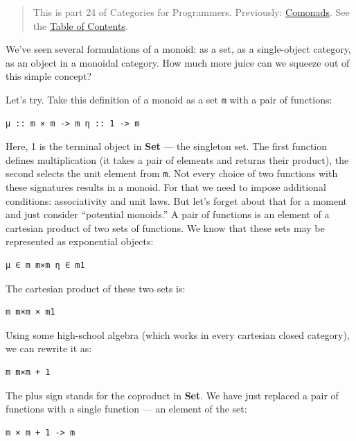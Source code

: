 \begin{quote}
This is part 24 of Categories for Programmers. Previously:
\href{https://bartoszmilewski.com/2017/01/02/comonads/}{Comonads}. See
the
\href{https://bartoszmilewski.com/2014/10/28/category-theory-for-programmers-the-preface/}{Table
of Contents}.
\end{quote}

We've seen several formulations of a monoid: as a set, as a
single-object category, as an object in a monoidal category. How much
more juice can we squeeze out of this simple concept?

Let's try. Take this definition of a monoid as a set \texttt{m} with a
pair of functions:

\begin{verbatim}
μ :: m × m -> m η :: 1 -> m
\end{verbatim}

Here, 1 is the terminal object in \textbf{Set} --- the singleton set.
The first function defines multiplication (it takes a pair of elements
and returns their product), the second selects the unit element from
\texttt{m}. Not every choice of two functions with these signatures
results in a monoid. For that we need to impose additional conditions:
associativity and unit laws. But let's forget about that for a moment
and just consider ``potential monoids.'' A pair of functions is an
element of a cartesian product of two sets of functions. We know that
these sets may be represented as exponential objects:

\begin{verbatim}
μ ∈ m m×m η ∈ m1
\end{verbatim}

The cartesian product of these two sets is:

\begin{verbatim}
m m×m × m1
\end{verbatim}

Using some high-school algebra (which works in every cartesian closed
category), we can rewrite it as:

\begin{verbatim}
m m×m + 1
\end{verbatim}

The plus sign stands for the coproduct in \textbf{Set}. We have just
replaced a pair of functions with a single function --- an element of
the set:

\begin{verbatim}
m × m + 1 -> m
\end{verbatim}

